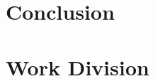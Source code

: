 \documentclass[10pt,twocolumn,letterpaper]{article}
\begin{document}
\section{Conclusion}
\section{Work Division}







\end{document}
